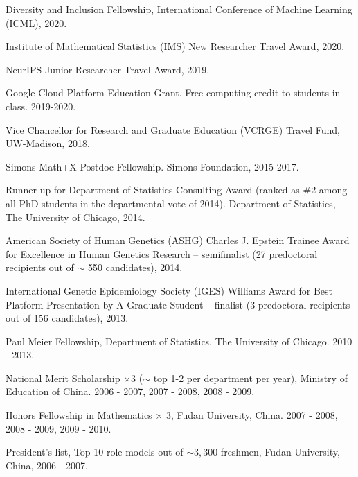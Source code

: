\documentclass[letterpaper]{article}
\renewenvironment{itemize}{
  \begin{list}{}{
    \setlength{\leftmargin}{1.5em}
  }
}{
  \end{list}
}
\begin{document}
\begin{itemize}
\item Diversity and Inclusion Fellowship, International Conference of Machine Learning (ICML), 2020.
\item Institute of Mathematical Statistics (IMS) New Researcher Travel Award, 2020.
\item NeurIPS Junior Researcher Travel Award, 2019.
\item Google Cloud Platform Education Grant. Free computing credit to students in class. 2019-2020. 
\item Vice Chancellor for Research and Graduate Education (VCRGE) Travel Fund, UW-Madison, 2018. 
\item  Simons Math+X Postdoc Fellowship. Simons Foundation, 2015-2017. 
\item Runner-up for Department of Statistics Consulting Award (ranked as \#2 among all PhD students in the departmental vote of 2014). Department of Statistics, The University of Chicago, 2014. 
\item American Society of Human Genetics (ASHG) Charles J. Epstein Trainee Award for Excellence in Human Genetics Research -- semifinalist (27 predoctoral recipients out of $\sim$ 550 candidates), 2014. 
\item International Genetic Epidemiology Society (IGES) Williams Award for Best Platform Presentation by A Graduate Student -- finalist (3 predoctoral recipients out of 156 candidates), 2013. 
\item  Paul Meier Fellowship, Department of Statistics, The University of Chicago. 2010 - 2013.
\item National Merit Scholarship $\times$3 ($\sim$ top 1-2 per department per year), Ministry of Education of China. 2006 - 2007, 2007 - 2008, 2008 - 2009.
\item Honors Fellowship in Mathematics $\times$ 3, Fudan University, China. 2007 - 2008, 2008 - 2009, 2009 - 2010.
\item President's list, Top 10 role models out of $\sim 3,300$ freshmen, Fudan University, China, 2006 - 2007. 
\end{itemize}
\end{document}
